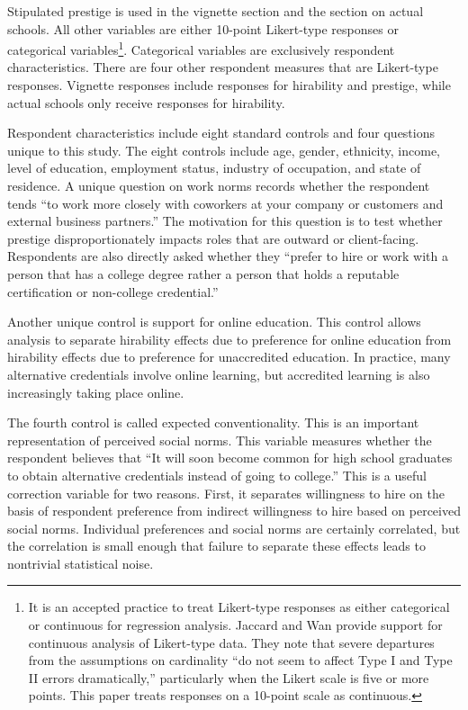 \documentclass[review]{elsarticle}
\begin{document}
Stipulated prestige is used in the vignette section and the section on actual schools.
All other variables are either 10-point Likert-type responses or categorical variables\footnote{
    It is an accepted practice to treat Likert-type responses as either categorical or continuous for regression analysis.
    Jaccard and Wan provide support for continuous analysis of Likert-type data.
    They note that severe departures from the assumptions on cardinality ``do not seem to affect Type I and Type II errors dramatically,''
    particularly when the Likert scale is five or more points\cite{jaccard1996lisrel}.
    This paper treats responses on a 10-point scale as continuous.
}.
Categorical variables are exclusively respondent characteristics.
There are four other respondent measures that are Likert-type responses.
Vignette responses include responses for hirability and prestige,
while actual schools only receive responses for hirability.

Respondent characteristics include eight standard controls and four questions unique to this study.
The eight controls include
age, gender, ethnicity, income,
level of education, employment status, industry of occupation, and state of residence.
A unique question on work norms records whether the respondent tends ``to work more closely with coworkers at your company or customers and external business partners.''
The motivation for this question is to test whether prestige disproportionately impacts roles that are outward or client-facing.
Respondents are also directly asked whether they
``prefer to hire or work with a person that has a college degree rather a person that holds a reputable certification or non-college credential.''

Another unique control is support for online education.
This control allows analysis to separate hirability effects due to preference for online education
from hirability effects due to preference for unaccredited education.
In practice, many alternative credentials involve online learning,
but accredited learning is also increasingly taking place online.

The fourth control is called expected conventionality.
This is an important representation of perceived social norms.
This variable measures whether the respondent believes that
``It will soon become common for high school graduates to obtain alternative credentials instead of going to college.''
This is a useful correction variable for two reasons.
First, it separates willingness to hire on the basis of respondent preference
from indirect willingness to hire based on perceived social norms.
Individual preferences and social norms are certainly correlated,
but the correlation is small enough that failure to separate these effects leads to nontrivial statistical noise.
\end{document}
